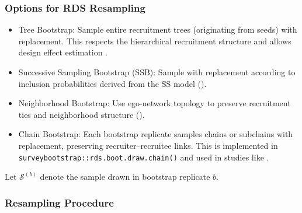 \documentclass[
  12pt,
  letterpaper,
  DIV=11,
  numbers=noendperiod]{scrartcl}
\providecommand{\tightlist}{%
  \setlength{\itemsep}{0pt}\setlength{\parskip}{0pt}}
\theoremstyle{plain}
\theoremstyle{definition}
\begin{document}
\subsubsection{Options for RDS
Resampling}\label{options-for-rds-resampling}

\begin{itemize}
\tightlist
\item
  Tree Bootstrap: Sample entire recruitment trees (originating from
  seeds) with replacement. This respects the hierarchical recruitment
  structure and allows design effect estimation
  \autocite{salg06-variance}.
\item
  Successive Sampling Bootstrap (SSB): Sample with replacement according
  to inclusion probabilities derived from the SS model
  (\textcite{gile11-improv}).
\item
  Neighborhood Bootstrap: Use ego-network topology to preserve
  recruitment ties and neighborhood structure
  (\textcite{yauc22-neighboor}).
\item
  Chain Bootstrap: Each bootstrap replicate samples chains or subchains
  with replacement, preserving recruiter--recruitee links. This is
  implemented in \texttt{surveybootstrap::rds.boot.draw.chain()} and
  used in studies like \textcite{weir12-comparison}.
\end{itemize}

Let \(\mathcal{S}^{(b)}\) denote the sample drawn in bootstrap replicate
\(b\).

\subsubsection{Resampling Procedure}\label{resampling-procedure}
\end{document}
